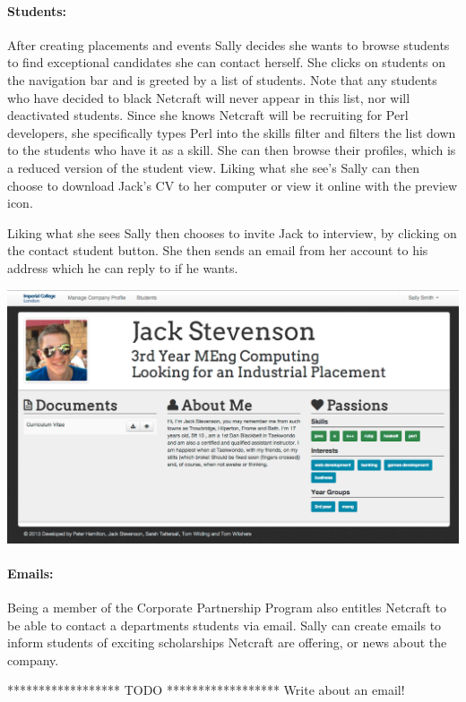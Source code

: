   \paragraph{Students:}
    After creating placements and events Sally decides she wants to browse students to find exceptional candidates she can contact herself. She clicks on students on the navigation bar and is greeted by a list of students. Note that any students who have decided to black Netcraft will never appear in this list, nor will deactivated students.
    Since she knows Netcraft will be recruiting for Perl developers, she specifically types Perl into the skills filter
    and filters the list down to the students who have it as a skill.
    She can then browse their profiles, which is a reduced version of the student view. Liking what she see's Sally can then choose to download Jack's CV to her computer or view it online with the preview icon. 

    Liking what she sees Sally then chooses to invite Jack to interview, by clicking on the contact student button. She then sends an email from her account to his address which he can reply to if he wants. 

    \includegraphics[scale=0.3]{images/user_experiences/company/jack_profile}

  \paragraph{Emails:}
    Being a member of the Corporate Partnership Program also entitles Netcraft to be able to contact a departments students via email. Sally can create emails to inform students of exciting scholarships Netcraft are offering, or news about the company.

    ****************** TODO ******************
    Write about an email!

